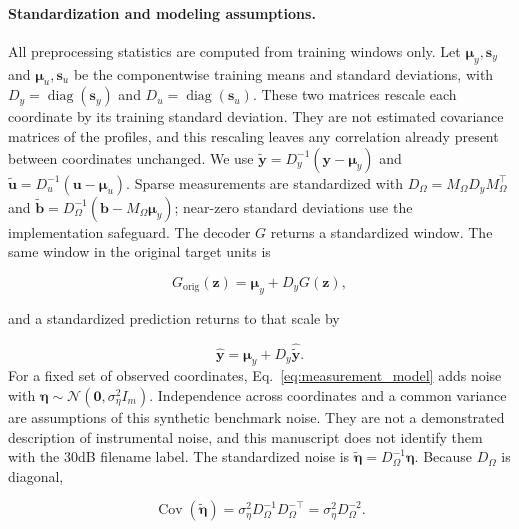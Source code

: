 \paragraph{Standardization and modeling assumptions.}
All preprocessing statistics are computed from training windows only. Let
$\boldsymbol{\mu}_y,\boldsymbol{s}_y$ and
$\boldsymbol{\mu}_u,\boldsymbol{s}_u$ be the componentwise training means and
standard deviations, with $D_y=\operatorname{diag}(\boldsymbol{s}_y)$ and
$D_u=\operatorname{diag}(\boldsymbol{s}_u)$. These two matrices rescale each
coordinate by its training standard deviation. They are not estimated
covariance matrices of the profiles, and this rescaling leaves any
correlation already present between coordinates unchanged. We use
$\widetilde{\boldsymbol{y}}=D_y^{-1}(\boldsymbol{y}-\boldsymbol{\mu}_y)$ and
$\widetilde{\boldsymbol{u}}=D_u^{-1}(\boldsymbol{u}-\boldsymbol{\mu}_u)$.
Sparse measurements are standardized with
$D_{\Omega}=M_{\Omega}D_yM_{\Omega}^{\top}$ and
$\widetilde{\boldsymbol{b}}=D_{\Omega}^{-1}
(\boldsymbol{b}-M_{\Omega}\boldsymbol{\mu}_y)$; near-zero standard deviations
use the implementation safeguard. The decoder $G$ returns a standardized
window. The same window in the original target units is

\begin{equation}
G_{\mathrm{orig}}(\boldsymbol{z})
=
\boldsymbol{\mu}_y
+
D_yG(\boldsymbol{z}),
\label{eq:g_orig}
\end{equation}

and a standardized prediction returns to that scale by

\begin{equation}
\widehat{\boldsymbol{y}}
=
\boldsymbol{\mu}_y
+
D_y\widehat{\widetilde{\boldsymbol{y}}}.
\label{eq:inverse_target_standardization}
\end{equation} For a fixed set
of observed coordinates, Eq.~\eqref{eq:measurement_model} adds noise with
$\boldsymbol{\eta}\sim\mathcal{N}(\boldsymbol{0},\sigma_{\eta}^{2}I_m)$.
Independence across coordinates and a common variance are assumptions of
this synthetic benchmark noise. They are not a demonstrated description of
instrumental noise, and this manuscript does not identify them with the
30dB filename label. The standardized noise is
$\widetilde{\boldsymbol{\eta}}=D_{\Omega}^{-1}\boldsymbol{\eta}$. Because
$D_{\Omega}$ is diagonal,

\begin{equation}
\operatorname{Cov}(\widetilde{\boldsymbol{\eta}})
=
\sigma_{\eta}^{2}D_{\Omega}^{-1}D_{\Omega}^{-\top}
=
\sigma_{\eta}^{2}D_{\Omega}^{-2}.
\label{eq:standardized_noise_covariance}
\end{equation}

